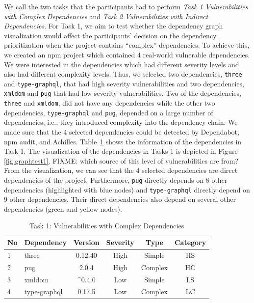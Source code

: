 \documentclass[conference]{IEEEtran}
\newcommand{\FIXME}[1]{{\color{red}\textsf{FIXME: #1}}}
\begin{document}
	We call the two tasks that the participants had to perform \textit{Task 1 Vulnerabilities with Complex Dependencies} and \textit{Task 2 Vulnerabilities with Indirect Dependencies}. For Task 1, we aim to test whether the dependency graph visualization  would affect the participants’ decision on the dependency prioritization when the project contains ``complex'' dependencies. To achieve this, we created an npm project which contained 4 real-world vulnerable dependencies. We were interested in the dependencies which had different severity levels and also had different complexity levels. Thus, we selected two dependencies, \texttt{three} and \texttt{type-graphql}, that had high severity vulnerabilities and two dependencies, \texttt{xmldom} and \texttt{pug} that had low severity vulnerabilities. Two of the dependencies, \texttt{three} and \texttt{xmldom}, did not have any dependencies while the other two dependencies, \texttt{type-graphql} and \texttt{pug}, depended on a large number of dependencies, i.e., they introduced complexity into the dependency chain. 
	We made sure that the 4 selected dependencies could be detected by Dependabot, npm audit, and Achilles. Table~\ref{table:cha-teat1} shows the information of the dependencies in Task 1. The visualization of the dependencies in Tasks 1 is depicted in Figure \ref{fig:graphtest1}. \FIXME{which source of this level of vulnerabilities are from?} From the visualization, we can see %
	that the 4 selected dependencies are direct dependencies of the project. Furthermore, \texttt{pug} directly depends on 8 other dependencies (highlighted with blue nodes) and \texttt{type-graphql} directly depend on 9 other dependencies. Their direct dependencies also depend on several other dependencies (green and yellow nodes).
	
	\begin{table}[tb]
		\centering
		\caption{Task 1: Vulnerabilities with Complex Dependencies}
		\begin{tabular}{llcccc}
			\toprule
			No & Dependency & Version & Severity & Type & Category \\
			\midrule
			1 & three & 0.12.40 & High & Simple & HS \\
			2 & pug & 2.0.4 & High & Complex &  HC \\
			3 & xmldom & \^{}0.4.0 & Low & Simple & LS \\
			4 & type-graphql & 0.17.5 & Low & Complex & LC \\
			\bottomrule
		\end{tabular}
		\label{table:cha-teat1}
	\end{table}
	
\end{document}
